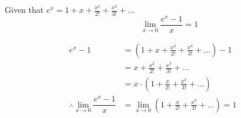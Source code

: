 \documentclass[14pt,fleqn]{extarticle}
\begin{document}
 

Given that $ e^x = 1 + x + \frac{x^2}{2!} + \frac{x^3}{3!} + \ldots$
\[\qquad \qquad \lim_{x\to 0}\dfrac{e^x-1}{x} = 1 \]
%

\newcard 

\begin{align}
e^x - 1 &= \left( 1 + x + \frac{x^2}{2!} + \frac{x^3}{3!} + \ldots\right) - 1 \\ 
&= x + \frac{x^2}{2!} + \frac{x^3}{3!} + \ldots \\
&= x\cdot\left( 1 + \frac{x}{2!} + \frac{x^2}{3!} + \ldots\right) \\
\therefore \lim_{x\to 0}\dfrac{e^x-1}{x} &= \lim_{x\to 0}\left( 1 + \frac{x}{2!} + \frac{x^2}{3!} + \ldots\right) = 1
\end{align}
\end{document}
